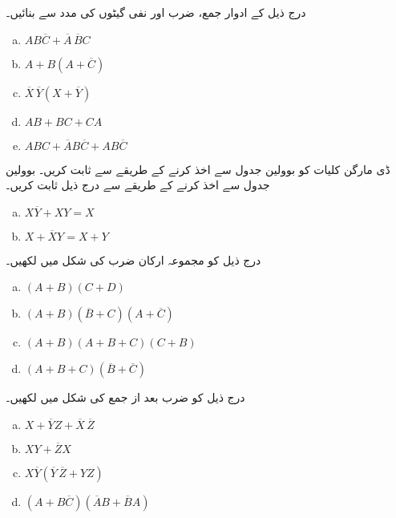 درج ذیل کے ادوار جمع، ضرب اور نفی گیٹوں کی مدد سے بنائیں۔
\begin{multicols}{3}
\begin{enumerate}[a.]
\item 
 \(AB\overline{C}+\overline{A}\,\overline{B}C\) 
\item 
 \(A+B(A+\overline{C})\)
\item 
 \(\overline{X}\,\overline{Y}(X+\overline{Y})\) 
\item 
 \(AB+BC+CA\)
\item 
 \(ABC+\overline{A}B\overline{C}+AB\overline{C}\)
\end{enumerate}
\end{multicols}
ڈی مارگن کلیات کو بوولین جدول سے اخذ کرنے کے طریقے  سے ثابت کریں۔
بوولین جدول سے اخذ کرنے کے طریقے  سے درج ذیل ثابت کریں۔
\begin{multicols}{2}
\begin{enumerate}[a.]
\item
 \(X\overline{Y}+XY=X\)
 \item
 \(X+\overline{X}Y=X+Y\)
 \end{enumerate}
 \end{multicols}
درج ذیل کو مجموعہ ارکان ضرب کی شکل میں لکھیں۔ 
\begin{multicols}{2}
\begin{enumerate}[a.]
\item
 \( (A+B)(C+D) \)
 \item
 \( (A+B)(\overline{B}+C)(A+\overline{C}) \)
\item
 \( (A+B)(A+B+C)(C+B) \)
 \item
 \( (A+B+C)(\overline{B}+\overline{C}) \)
  \end{enumerate}
 \end{multicols}
درج ذیل کو  ضرب بعد از جمع کی شکل میں لکھیں۔
\begin{multicols}{2}
\begin{enumerate}[a.]
\item
 \( X+\overline{Y}Z+\overline{X}\,\overline{Z} \)
 \item
 \( XY+\overline{Z}X \)
\item
 \( X\overline{Y}(\overline{Y}\,\overline{Z}+YZ) \)
 \item
 \( (A+B\overline{C})(\overline{A}B+\overline{B}A) \)
  \end{enumerate}
 \end{multicols}
